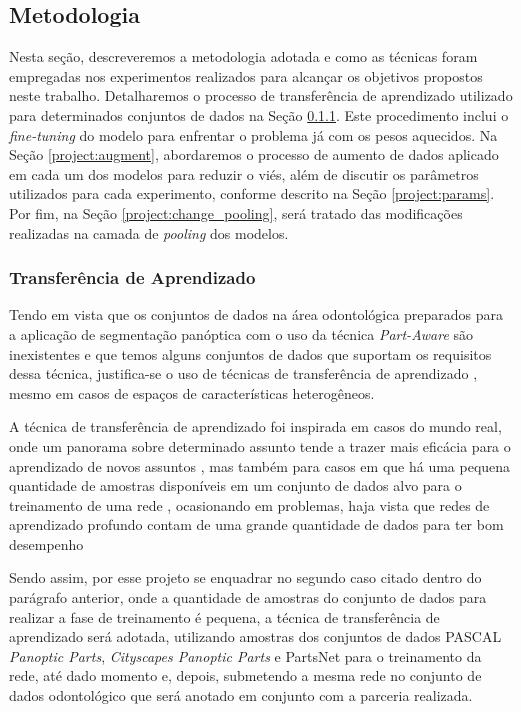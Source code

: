 \subsection{Metodologia}
\label{project:methodology}
Nesta seção, descreveremos a metodologia adotada e como as técnicas foram empregadas nos experimentos realizados para alcançar os objetivos propostos neste trabalho. Detalharemos o processo de transferência de aprendizado utilizado para determinados conjuntos de dados na Seção \ref{project:transf}. Este procedimento inclui o \textit{fine-tuning} do modelo para enfrentar o problema já com os pesos aquecidos. Na Seção \ref{project:augment}, abordaremos o processo de aumento de dados aplicado em cada um dos modelos para reduzir o viés, além de discutir os parâmetros utilizados para cada experimento, conforme descrito na Seção \ref{project:params}. Por fim, na Seção \ref{project:change_pooling}, será tratado das modificações realizadas na camada de \textit{pooling} dos modelos.


\subsubsection{Transferência de Aprendizado}
\label{project:transf}
Tendo em vista que os conjuntos de dados na área odontológica preparados para a aplicação de segmentação panóptica com o uso da técnica \textit{Part-Aware} são inexistentes e que temos alguns conjuntos de dados que suportam os requisitos dessa técnica, justifica-se o uso de técnicas de transferência de aprendizado \cite{Weiss2016}, mesmo em casos de espaços de características heterogêneos.

A técnica de transferência de aprendizado foi inspirada em casos do mundo real, onde um panorama sobre determinado assunto tende a trazer mais eficácia para o aprendizado de novos assuntos \cite{Pan2010}, mas também para casos em que há uma pequena quantidade de amostras disponíveis em um conjunto de dados alvo para o treinamento de uma rede \cite{Weiss2016}, ocasionando em problemas, haja vista que redes de aprendizado profundo contam de uma grande quantidade de dados para ter bom desempenho \cite{Goodfellow2016}

Sendo assim, por esse projeto se enquadrar no segundo caso citado dentro do parágrafo anterior, onde a quantidade de amostras do conjunto de dados para realizar a fase de treinamento é pequena, a técnica de transferência de aprendizado será adotada, utilizando amostras dos conjuntos de dados PASCAL \textit{Panoptic Parts}, \textit{Cityscapes Panoptic Parts} e PartsNet para o treinamento da rede, até dado momento e, depois, submetendo a mesma rede no conjunto de dados odontológico que será anotado em conjunto com a parceria realizada.

